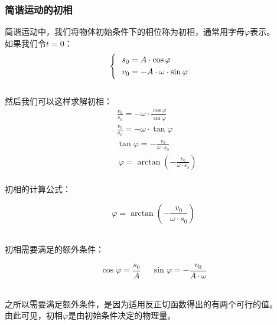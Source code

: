 \documentclass[UTF8]{ctexart}
\begin{document}
\newpage

\subsubsection{简谐运动的初相}
    简谐运动中，我们将物体初始条件下的相位称为初相，通常用字母$\varphi$表示。\\[5mm]
    如果我们令$t=0$：
    \setcounter{equation}{0}
    \begin{align}
        \begin{cases}
            ~~s_0=A\cdot\cos{\varphi}\\
            ~~v_0=-A\cdot\omega\cdot\sin{\varphi}\vspace{1pt}
        \end{cases}
    \end{align}\\
    然后我们可以这样求解初相：\vspace{5pt}
    \begin{align}
        &\frac{v_0}{s_0}=-\omega\cdot\frac{\cos{\varphi}}{\sin{\varphi}}\\[5mm]
        &\frac{v_0}{s_0}=-\omega\cdot\tan{\varphi}\\[5mm]
        &\tan{\varphi}=-\frac{v_0}{\omega\cdot s_0}\\[3mm]
        &~\varphi=\arctan{\left(-\frac{v_0}{\omega\cdot s_0}\right)}
    \end{align}\\
    初相的计算公式：
    \begin{large}
        \begin{equation*}
            \varphi=\arctan{\left(-\frac{v_0}{\omega\cdot s_0}\right)}
        \end{equation*}
    \end{large}\\
    初相需要满足的额外条件：
    \begin{large}
        \begin{equation*}
            \cos{\varphi}=\frac{s_0}{A}~~~~~~
            \sin{\varphi}=-\frac{v_0}{A\cdot\omega}
        \end{equation*}
    \end{large}\\
    之所以需要满足额外条件，是因为适用反正切函数得出的有两个可行的值。\\[3mm]
    由此可见，初相$\varphi$是由初始条件决定的物理量。\\[3mm]

\newpage
\end{document}
